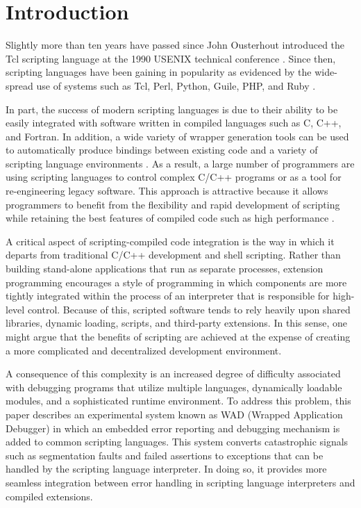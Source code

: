 \section{Introduction}

Slightly more than ten years have passed since John Ousterhout
introduced the Tcl scripting language at the 1990 USENIX technical
conference \cite{ousterhout}.  Since then, scripting languages have
been gaining in popularity as evidenced by the wide-spread use of
systems such as Tcl, Perl, Python, Guile, PHP, and Ruby
\cite{ousterhout,perl,python,guile,php,ruby}.

In part, the success of modern scripting languages is due to their
ability to be easily integrated with software written in compiled
languages such as C, C++, and Fortran.  In addition, a wide variety of wrapper
generation tools can be used
to automatically produce bindings between existing code and a
variety of scripting language environments
\cite{swig,sip,pyfort,f2py,advperl,heidrich,vtk,gwrap,wrappy}.  As a result, a large number of
programmers are using scripting languages to control
complex C/C++ programs or as a tool for re-engineering legacy
software.  This approach is attractive because it allows programmers
to benefit from the flexibility and rapid development of
scripting while retaining the best features of compiled code such as high
performance \cite{ouster1}.

A critical aspect of scripting-compiled code integration is the way in
which it departs from traditional C/C++ development and shell
scripting.  Rather than building stand-alone applications that run as
separate processes, extension programming encourages a style of
programming in which components are more tightly integrated within the
process of an interpreter that is responsible for high-level control.
Because of this, scripted software tends to rely heavily
upon shared libraries, dynamic loading, scripts, and
third-party extensions. In this sense, one might argue that the
benefits of scripting are achieved at the expense of creating a
more complicated and decentralized development environment.

A consequence of this complexity is an increased degree of difficulty
associated with debugging programs that utilize multiple languages,
dynamically loadable modules, and a sophisticated runtime environment.
To address this problem, this paper describes an experimental system
known as WAD (Wrapped Application Debugger) in which an embedded error
reporting and debugging mechanism is added to common scripting
languages.  This system converts catastrophic signals such as
segmentation faults and failed assertions to exceptions that can be
handled by the scripting language interpreter.  In doing so, it
provides more seamless integration between error handling in
scripting language interpreters and compiled extensions. 

